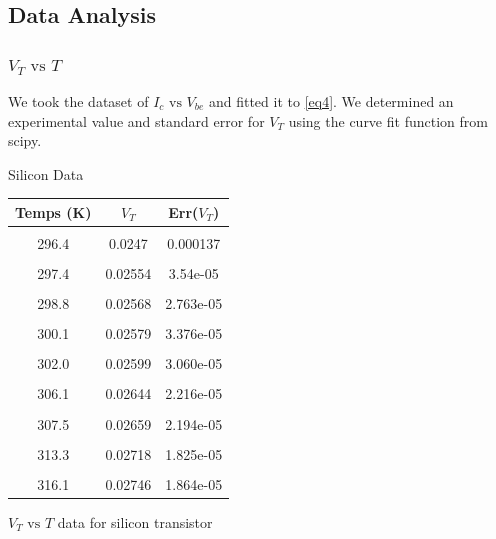 \documentclass[12pt,letterpaper,twocolumn]{article}
\begin{document}


\subsection{Data Analysis}
\subsubsection{$V_T \text{ vs } T$}
We took the dataset of $I_c \text{ vs }V_{be}$ and fitted it to \ref{eq4}. We determined an experimental value and standard error for $V_T$ using the curve fit function from scipy.

\begin {table}[H]
\caption*{Silicon Data}
{\footnotesize
\begin {center}
\begin {tabular} {|c | c | c| }
\hline
Temps (K) 			&    $V_T$		& Err($V_T$)\\
\hline  &&\\
296.4   & 0.0247 &  0.000137\\
\hline  && \\
297.4   & 0.02554 &  3.54e-05\\
\hline  && \\
298.8   & 0.02568 &  2.763e-05\\
\hline  && \\
300.1   & 0.02579 &  3.376e-05\\
\hline  && \\
302.0   & 0.02599 &  3.060e-05\\
\hline  && \\
306.1   & 0.02644 &  2.216e-05\\
\hline  && \\
307.5   & 0.02659 &  2.194e-05\\
\hline  && \\
313.3   & 0.02718 &  1.825e-05\\
\hline  && \\
316.1	& 0.02746 &  1.864e-05\\
\hline%
\end {tabular}
\end {center}
}
\caption{\label{tab1} $V_T \text{ vs } T$ data for silicon transistor}
\end {table}
\end{document}
